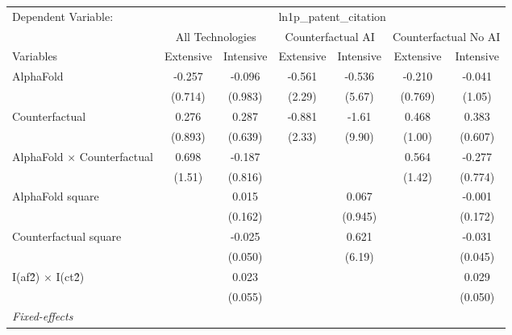 \begingroup
\centering
\begin{tabular}{lcccccc}
   \tabularnewline \midrule \midrule
   Dependent Variable: & \multicolumn{6}{c}{ln1p\_patent\_citation}\\
 & \multicolumn{2}{c}{All Technologies} & \multicolumn{2}{c}{Counterfactual AI} & \multicolumn{2}{c}{Counterfactual No AI} \\
\cmidrule(lr){1-1}\cmidrule(lr){2-3} \cmidrule(lr){4-5} \cmidrule(lr){6-7}
Variables & \multicolumn{1}{c}{Extensive} & \multicolumn{1}{c}{Intensive} & \multicolumn{1}{c}{Extensive} & \multicolumn{1}{c}{Intensive} & \multicolumn{1}{c}{Extensive} & \multicolumn{1}{c}{Intensive} \\
\cmidrule(lr){1-1}\cmidrule(lr){2-2} \cmidrule(lr){3-3} \cmidrule(lr){4-4} \cmidrule(lr){5-5} \cmidrule(lr){6-6} \cmidrule(lr){7-7}
   AlphaFold                          & -0.257  & -0.096  & -0.561 & -0.536  & -0.210  & -0.041\\   
                                      & (0.714) & (0.983) & (2.29) & (5.67)  & (0.769) & (1.05)\\   
   Counterfactual                     & 0.276   & 0.287   & -0.881 & -1.61   & 0.468   & 0.383\\   
                                      & (0.893) & (0.639) & (2.33) & (9.90)  & (1.00)  & (0.607)\\   
   AlphaFold $\times$ Counterfactual  & 0.698   & -0.187  &        &         & 0.564   & -0.277\\   
                                      & (1.51)  & (0.816) &        &         & (1.42)  & (0.774)\\   
   AlphaFold square                   &         & 0.015   &        & 0.067   &         & -0.001\\   
                                      &         & (0.162) &        & (0.945) &         & (0.172)\\   
   Counterfactual square              &         & -0.025  &        & 0.621   &         & -0.031\\   
                                      &         & (0.050) &        & (6.19)  &         & (0.045)\\   
   I(af\^2) $\times$ I(ct\^2)         &         & 0.023   &        &         &         & 0.029\\   
                                      &         & (0.055) &        &         &         & (0.050)\\   
   \midrule
   \emph{Fixed-effects}\\

\end{tabular}
